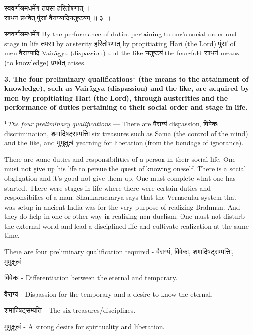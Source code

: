 \documentclass{article}
\begin{document}
\begin{large}
\begin{center}
    \begin{hindi}
	स्ववर्णाश्रमधर्मेण तपसा हरितोषणात् ।\\
	साधनं प्रभवेत् पुंसां वैराग्यादिचतुष्टयम् ॥ ३ ॥
    \end{hindi}
\end{center}
\end{large}

\texthindi{स्ववर्णाश्रमधर्मेण}
By the performance of duties pertaining to one's social order and stage in
life
\texthindi{तपसा}
by austerity
\texthindi{हरितोषणात्}
by propitiating Hari (the Lord)
\texthindi{पुंसां}
of men
\texthindi{वैराग्यादि}
Vairâgya (dispassion) and the like
\texthindi{चतुष्टयं}
the four-fold
\texthindi{साधनं}
means (to knowledge)
\texthindi{प्रभवेत्}
arises.

\bigskip

\textbf{ 3. The four preliminary qualifications$^1$ (the means to the
attainment of knowledge), such as Vairâgya (dispassion) and the like, are
acquired by men by propitiating Hari (the Lord), through austerities and the
performance of duties pertaining to their social order and stage in life.  }

{\small
\textit{$^1$The four preliminary qualifications} --- There are
\texthindi{वैराग्यं}
dispassion,
\texthindi{विवेकः}
discrimination,
\texthindi{शमादिषट्सम्पत्तिः}
six treasures such as Sama (the control of the mind) and the like, and
\texthindi{मुमुक्षुत्वं}
yearning for liberation (from the bondage of ignorance).
}

\begin{oframed}

There are some duties and responsibilities of a person in their social life.
One must not give up his life to persue the quest of knowing oneself. There is
a social obgligation and it's good not give them up. One must complete what one
has started. There were stages in life where there were certain duties and
responsibilies of a man. Shankaracharya says that the Vernacular system that
was setup in ancient India was for the very purpose of realizing Brahman. And
they do help in one or other way in realizing non-dualism. One must not disturb
the external world and lead a disciplined life and cultivate realization at the
same time.

There are four preliminary qualification required -
\texthindi{वैराग्यं, विवेकः, शमादिषट्सम्पत्तिः, मुमुक्षुत्वं}

\texthindi{विवेकः}
- Differentiation between the eternal and temporary.

\texthindi{वैराग्यं}
- Dispassion for the temporary and a desire to know the eternal.

\texthindi{शमादिषट्सम्पत्ति}
- The six treasures/disciplines.

\texthindi{मुमुक्षुत्वं}
- A strong desire for spirituality and liberation.

\end{oframed}
\end{document}
